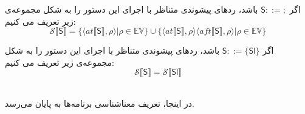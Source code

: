 \begin{defn}
	اگر $         \mathsf{S} ::=;  $ باشد، ردهای پیشوندی متناظر با اجرای این دستور را به شکل مجموعه‌ی زیر تعریف می کنیم:
	$$\mathcal{S} \llbracket\mathsf{S}\rrbracket = \{ \langle at\llbracket\mathsf{S}\rrbracket , \rho \rangle | \rho \in \mathbb{EV}       \} \cup     \{ \langle at\llbracket\mathsf{S}\rrbracket , \rho \rangle \langle aft\llbracket\mathsf{S}\rrbracket , \rho \rangle | \rho \in \mathbb{EV}       \}             $$  
	
	
	اگر $         \mathsf{S} ::=\{\mathsf{Sl}\}  $ باشد، ردهای پیشوندی متناظر با اجرای این دستور را به شکل مجموعه‌ی زیر تعریف می کنیم:
	$$\mathcal{S} \llbracket\mathsf{S}\rrbracket = \mathcal{S} \llbracket\mathsf{Sl}\rrbracket $$   \\
\end{defn}
در اینجا، تعریف معناشناسی برنامه‌ها به پایان می‌رسد.







